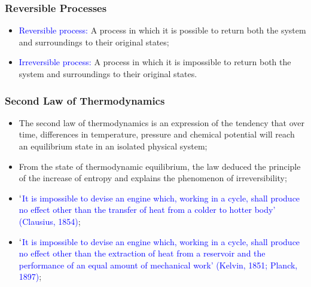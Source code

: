 \documentclass[10pt,compress,handout,ignorenonframetext]{beamer}
\begin{document}
\begin{frame}
 \frametitle{Reversible Processes}
 \begin{itemize}
  \item <2-> \textcolor{blue}{Reversible process:} A process in which it is possible to return both the system and surroundings to their original states;
  \item <3-> \textcolor{blue}{Irreversible process:} A process in which it is impossible to return both the system and surroundings to their original states.
 \end{itemize}

\end{frame}



\begin{frame}
 \frametitle{Second Law of Thermodynamics}
 \begin{itemize}
  \item <2->The second law of thermodynamics is an expression of the tendency that over time, differences in temperature, pressure and chemical potential will reach an equilibrium state in an isolated physical system;
  \item <3->From the state of thermodynamic equilibrium, the law deduced the principle of the increase of entropy and explains the phenomenon of irreversibility;
  \item <4->\textcolor{blue}{$\lq$It is impossible to devise an engine which, working in a cycle, shall produce no effect other than the transfer of heat from a colder to hotter body' (Clausius, 1854)};   
  \item <5->\textcolor{blue}{$\lq$It is impossible to devise an engine which, working in a cycle, shall produce no effect other than the extraction of heat from a reservoir and the performance of an equal amount of mechanical work' (Kelvin, 1851; Planck, 1897)};
 \end{itemize}
 \normalsize
\end{frame}
\end{document}
